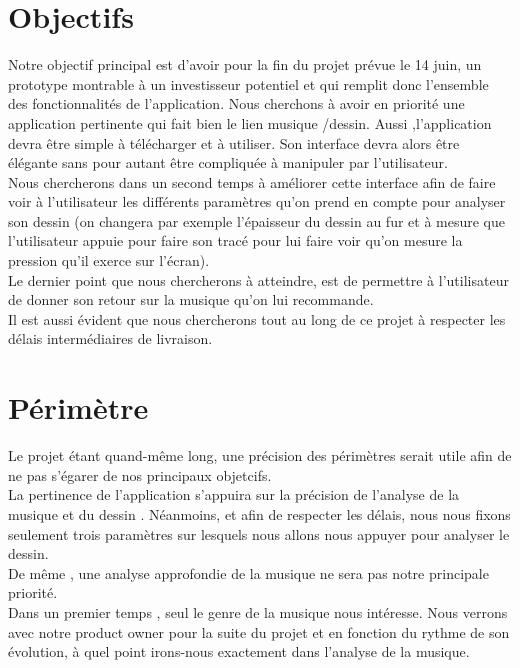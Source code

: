 \documentclass[11pt]{article}
\begin{document}
\section{Objectifs}
Notre objectif principal est d’avoir pour la fin du projet prévue le 14 juin, un prototype montrable à un investisseur potentiel et qui remplit donc l’ensemble des fonctionnalités de l’application. Nous cherchons à avoir en priorité une application pertinente qui fait bien le lien musique /dessin. Aussi ,l’application devra être simple à télécharger et à utiliser. Son interface devra alors être élégante sans pour autant être compliquée à manipuler par l’utilisateur.\\
Nous chercherons dans un second temps à améliorer cette interface afin de  faire voir à l’utilisateur les différents paramètres qu’on prend en compte pour analyser son dessin (on changera par exemple l’épaisseur du dessin au fur et à mesure que l’utilisateur appuie pour faire son tracé pour lui faire voir qu'on mesure la pression qu'il exerce sur l'écran).\\
Le dernier point que nous chercherons à atteindre, est de permettre à l’utilisateur de donner son retour sur la musique qu’on lui recommande.\\
Il est aussi évident que nous chercherons tout au long de ce projet à respecter les délais intermédiaires de livraison.\\  

 

\section{Périmètre}
Le projet étant  quand-même long, une précision des périmètres serait utile afin de ne pas s’égarer de nos principaux objetcifs.\\
La pertinence de l’application s’appuira sur la précision de l’analyse de la musique et du dessin .
Néanmoins, et afin de respecter les délais, nous nous fixons seulement  trois paramètres sur lesquels nous allons nous appuyer pour analyser le dessin.\\
De même , une analyse approfondie de la musique ne sera pas notre principale priorité.\\
Dans un premier temps , seul le genre de la musique nous intéresse. Nous verrons avec notre product owner pour la suite du projet et en fonction du rythme de son évolution, à quel point irons-nous exactement dans l’analyse de la musique.\\
 
\end{document}
